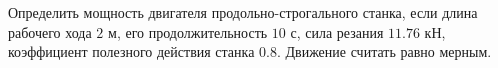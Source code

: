 Определить мощность двигателя продольно-строгального станка, если длина
рабочего хода $2$ м, его продолжительность $10$ с, сила резания $11.76$
кН, коэффициент полезного действия станка $0.8$. Движение считать равно
мерным.
